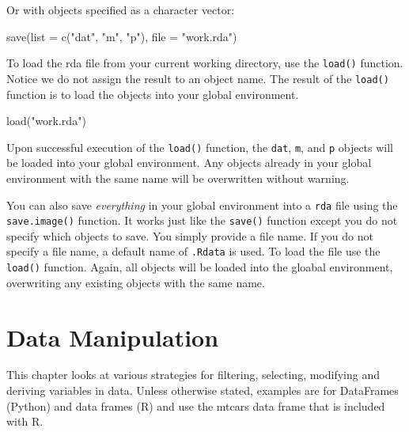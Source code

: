 \documentclass[
]{book}
\newenvironment{Shaded}{\begin{snugshade}}{\end{snugshade}}
\newcommand{\AttributeTok}[1]{\textcolor[rgb]{0.77,0.63,0.00}{#1}}
\newcommand{\FunctionTok}[1]{\textcolor[rgb]{0.00,0.00,0.00}{#1}}
\newcommand{\NormalTok}[1]{#1}
\newcommand{\StringTok}[1]{\textcolor[rgb]{0.31,0.60,0.02}{#1}}
\begin{document}
Or with objects specified as a character vector:

\begin{Shaded}
\begin{Highlighting}[]
\FunctionTok{save}\NormalTok{(}\AttributeTok{list =} \FunctionTok{c}\NormalTok{(}\StringTok{"dat"}\NormalTok{, }\StringTok{"m"}\NormalTok{, }\StringTok{"p"}\NormalTok{), }\AttributeTok{file =} \StringTok{"work.rda"}\NormalTok{)}
\end{Highlighting}
\end{Shaded}

To load the rda file from your current working directory, use the \texttt{load()} function. Notice we do not assign the result to an object name. The result of the \texttt{load()} function is to load the objects into your global environment.

\begin{Shaded}
\begin{Highlighting}[]
\FunctionTok{load}\NormalTok{(}\StringTok{"work.rda"}\NormalTok{)}
\end{Highlighting}
\end{Shaded}

Upon successful execution of the \texttt{load()} function, the \texttt{dat}, \texttt{m}, and \texttt{p} objects will be loaded into your global environment. Any objects already in your global environment with the same name will be overwritten without warning.

You can also save \emph{everything} in your global environment into a \texttt{rda} file using the \texttt{save.image()} function. It works just like the \texttt{save()} function except you do not specify which objects to save. You simply provide a file name. If you do not specify a file name, a default name of \texttt{.Rdata} is used. To load the file use the \texttt{load()} function. Again, all objects will be loaded into the gloabal environment, overwriting any existing objects with the same name.

\hypertarget{data-manipulation}{%
\chapter{Data Manipulation}\label{data-manipulation}}

This chapter looks at various strategies for filtering, selecting, modifying and deriving variables in data. Unless otherwise stated, examples are for DataFrames (Python) and data frames (R) and use the mtcars data frame that is included with R.
\end{document}
